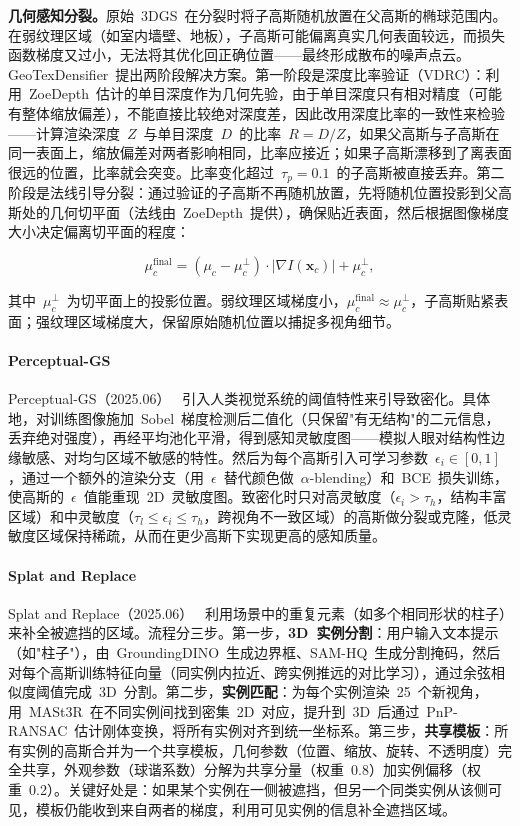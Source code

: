 \textbf{几何感知分裂。}原始~3DGS~在分裂时将子高斯随机放置在父高斯的椭球范围内。在弱纹理区域（如室内墙壁、地板），子高斯可能偏离真实几何表面较远，而损失函数梯度又过小，无法将其优化回正确位置——最终形成散布的噪声点云。GeoTexDensifier~提出两阶段解决方案。第一阶段是深度比率验证（VDRC）：利用~ZoeDepth~估计的单目深度作为几何先验，由于单目深度只有相对精度（可能有整体缩放偏差），不能直接比较绝对深度差，因此改用深度比率的一致性来检验——计算渲染深度~$Z$~与单目深度~$D$~的比率~$R = D/Z$，如果父高斯与子高斯在同一表面上，缩放偏差对两者影响相同，比率应接近；如果子高斯漂移到了离表面很远的位置，比率就会突变。比率变化超过~$\tau_p=0.1$~的子高斯被直接丢弃。第二阶段是法线引导分裂：通过验证的子高斯不再随机放置，先将随机位置投影到父高斯处的几何切平面（法线由~ZoeDepth~提供），确保贴近表面，然后根据图像梯度大小决定偏离切平面的程度：

\begin{equation*}
\mu_c^{\text{final}} = (\mu_c - \mu_c^\perp) \cdot |\nabla I(\mathbf{x}_c)| + \mu_c^\perp,
\end{equation*}

其中~$\mu_c^\perp$~为切平面上的投影位置。弱纹理区域梯度小，$\mu_c^{\text{final}} \approx \mu_c^\perp$，子高斯贴紧表面；强纹理区域梯度大，保留原始随机位置以捕捉多视角细节。

\paragraph{Perceptual-GS}
Perceptual-GS（2025.06）~\cite{2506_12400} 引入人类视觉系统的阈值特性来引导致密化。具体地，对训练图像施加~Sobel~梯度检测后二值化（只保留"有无结构"的二元信息，丢弃绝对强度），再经平均池化平滑，得到感知灵敏度图——模拟人眼对结构性边缘敏感、对均匀区域不敏感的特性。然后为每个高斯引入可学习参数~$\epsilon_i \in [0,1]$，通过一个额外的渲染分支（用~$\epsilon$~替代颜色做~$\alpha$-blending）和~BCE~损失训练，使高斯的~$\epsilon$~值能重现~2D~灵敏度图。致密化时只对高灵敏度（$\epsilon_i > \tau_h$，结构丰富区域）和中灵敏度（$\tau_l \leq \epsilon_i \leq \tau_h$，跨视角不一致区域）的高斯做分裂或克隆，低灵敏度区域保持稀疏，从而在更少高斯下实现更高的感知质量。

\paragraph{Splat and Replace}
Splat and Replace（2025.06）~\cite{2506_06462} 利用场景中的重复元素（如多个相同形状的柱子）来补全被遮挡的区域。流程分三步。第一步，\textbf{3D~实例分割}：用户输入文本提示（如"柱子"），由~GroundingDINO~生成边界框、SAM-HQ~生成分割掩码，然后对每个高斯训练特征向量（同实例内拉近、跨实例推远的对比学习），通过余弦相似度阈值完成~3D~分割。第二步，\textbf{实例匹配}：为每个实例渲染~25~个新视角，用~MASt3R~在不同实例间找到密集~2D~对应，提升到~3D~后通过~PnP-RANSAC~估计刚体变换，将所有实例对齐到统一坐标系。第三步，\textbf{共享模板}：所有实例的高斯合并为一个共享模板，几何参数（位置、缩放、旋转、不透明度）完全共享，外观参数（球谐系数）分解为共享分量（权重~0.8）加实例偏移（权重~0.2）。关键好处是：如果某个实例在一侧被遮挡，但另一个同类实例从该侧可见，模板仍能收到来自两者的梯度，利用可见实例的信息补全遮挡区域。

